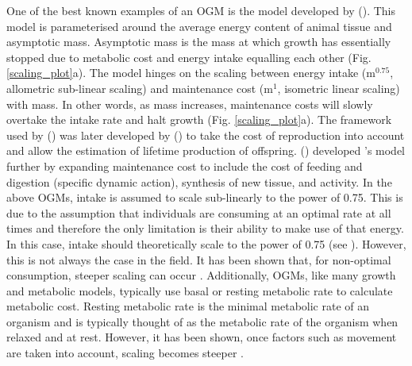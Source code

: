\documentclass[a4paper, 11pt, hidelinks]{article} %
\begin{document}
	One of the best known examples of an OGM is the model developed by \citeauthor{West2001} (\citeyear{West2001}).  This model is parameterised around the average energy content of animal tissue and asymptotic mass.  Asymptotic mass is the mass at which growth has essentially stopped due to metabolic cost and energy intake equalling each other (Fig. \ref{scaling_plot}a). The model hinges on the scaling between energy intake (m$^{0.75}$, allometric sub-linear scaling) and maintenance cost (m$^1$, isometric linear scaling) with mass.  In other words, as mass increases, maintenance costs will slowly overtake the intake rate and halt growth (Fig. \ref{scaling_plot}a).  	
	The framework used by \citeauthor{West2001} (\citeyear{West2001}) was later developed by \citeauthor{Charnov2001} (\citeyear{Charnov2001}) to take the cost of reproduction into account and allow the estimation of lifetime production of offspring.  \citeauthor{Hou2008} (\citeyear{Hou2008})  developed \citeauthor{West2001}'s model further by expanding maintenance cost to include the cost of feeding and digestion (specific dynamic action), synthesis of new tissue, and activity.
	In the above OGMs, intake is assumed to scale sub-linearly to the power of 0.75.  This is due to the assumption that individuals are consuming at an optimal rate at all times and therefore the only limitation is their ability to make use of that energy.  In this case, intake should theoretically scale to the power of 0.75 (see \cite{West1997}).  However, this is not always the case in the field.  It has been shown that, for non-optimal consumption, steeper scaling can occur \parencite{Pawar2012, Peters1983}. Additionally, OGMs, like many growth and metabolic models, typically use basal or resting metabolic rate to calculate metabolic cost.  Resting metabolic rate is the minimal metabolic rate of an organism and is typically thought of as the metabolic rate of the organism when relaxed and at rest.  However, it has been shown, once factors such as movement are taken into account, scaling becomes steeper \parencite{Weibel2004}.
	
\end{document}
